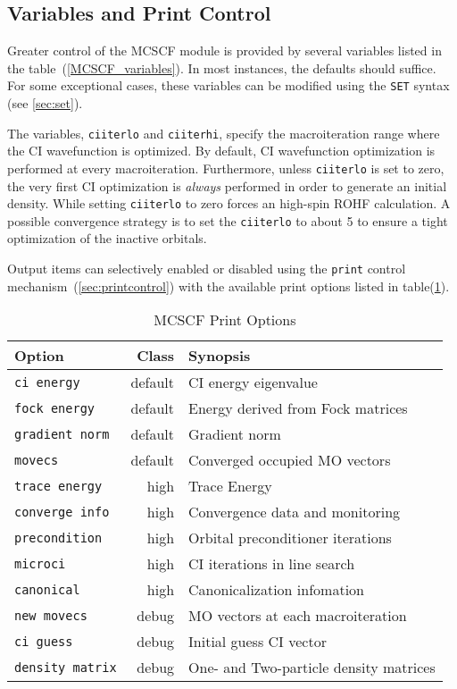 \subsection{Variables and Print Control}
Greater control of the MCSCF module is provided by several variables
listed in the table~(\ref{MCSCF_variables}). In most instances, the
defaults should suffice. For some exceptional cases, these variables can
be modified using the \verb+SET+ syntax (see \ref{sec:set}).

The variables, \verb+ciiterlo+ and \verb+ciiterhi+, specify the
macroiteration range where the CI wavefunction is optimized. By
default, CI wavefunction optimization is performed at every
macroiteration. Furthermore, unless \verb+ciiterlo+ is set to zero,
the very first CI optimization is {\em always} performed in order to
generate an initial density. While setting \verb+ciiterlo+ to zero
forces an high-spin ROHF calculation. A possible convergence strategy
is to set the \verb+ciiterlo+ to about 5 to ensure a tight
optimization of the inactive orbitals.

Output items can selectively enabled or disabled using the
\verb+print+ control mechanism~(\ref{sec:printcontrol}) with the
available print options listed in table(\ref{MCSCF_print_options}).



\begin{table}
\caption{MCSCF Print Options}
\label{MCSCF_print_options}
\vspace{.2in}
\begin{tabular}{lrl}
\hline\hline
Option                          & Class    &  Synopsis \\
\hline
\verb+ci energy+                & default  &  CI energy eigenvalue \\
\verb+fock energy+              & default  &  Energy derived from Fock matrices \\
\verb+gradient norm+            & default  &  Gradient norm \\
\verb+movecs+                   & default  &  Converged occupied MO vectors \\
\verb+trace energy+             & high     &  Trace Energy \\
\verb+converge info+            & high     &  Convergence data and monitoring \\
\verb+precondition+             & high     &  Orbital preconditioner iterations \\
\verb+microci+                  & high     &  CI iterations in line search \\
\verb+canonical+                & high     &  Canonicalization infomation \\
\verb+new movecs+               & debug    &  MO vectors at each macroiteration \\
\verb+ci guess+                 & debug    &  Initial guess CI vector \\
\verb+density matrix+           & debug    &  One- and Two-particle density matrices \\
\hline\hline
\end{tabular}
\end{table}
